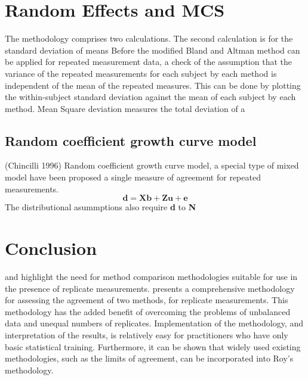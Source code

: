 \documentclass[12pt, a4paper]{report}
\theoremstyle{plain}
\theoremstyle{definition}
\theoremstyle{remark}
\begin{document}


\section{Random Effects and MCS}
The methodology comprises two calculations. The second calculation
is for the standard deviation of means Before the modified Bland
and Altman method can be applied for repeated measurement data, a
check of the assumption that the variance of the repeated
measurements for each subject by each method is independent of the
mean of the repeated measures. This can be done by plotting the
within-subject standard deviation against the mean of each subject
by each method. Mean Square deviation measures the total deviation
of a


\subsection{Random coefficient growth curve model} (Chincilli
1996) Random coefficient growth curve model, a special type of
mixed model have been proposed a single measure of agreement for
repeated measurements.
\begin{equation}
\textbf{d}= \textbf{Xb} + \textbf{Zu} + \textbf{e}
\end{equation}
The distributional asummptions also require \textbf{d} to
\textbf{N}


\section{Conclusion}
\citet{BXC2008} and \citet{roy} highlight the need for method comparison methodologies suitable for use in the presence of replicate measurements. \citet{roy} presents a comprehensive methodology for assessing the agreement of two methods, for replicate measurements. This methodology has the added benefit of overcoming the problems of unbalanced data and unequal numbers of replicates. Implementation of the methodology, and interpretation of the results, is relatively easy for practitioners who have only basic statistical training. Furthermore, it can be shown that widely used existing methodologies, such as the limits of agreement, can be incorporated into Roy's methodology.
\end{document}
